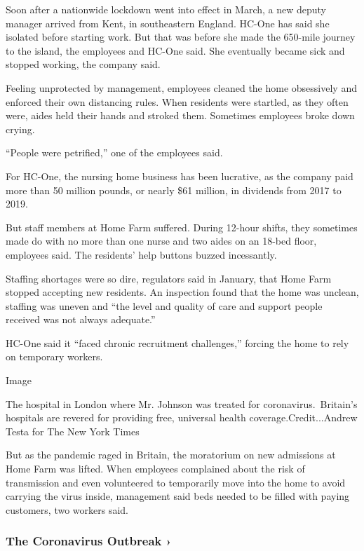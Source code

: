 Soon after a nationwide lockdown went into effect in March, a new deputy
manager arrived from Kent, in southeastern England. HC-One has said she
isolated before starting work. But that was before she made the 650-mile
journey to the island, the employees and HC-One said. She eventually
became sick and stopped working, the company said.

Feeling unprotected by management, employees cleaned the home
obsessively and enforced their own distancing rules. When residents were
startled, as they often were, aides held their hands and stroked them.
Sometimes employees broke down crying.

``People were petrified,'' one of the employees said.

For HC-One, the nursing home business has been lucrative, as the company
paid more than 50 million pounds, or nearly \$61 million, in dividends
from 2017 to 2019.

But staff members at Home Farm suffered. During 12-hour shifts, they
sometimes made do with no more than one nurse and two aides on an 18-bed
floor, employees said. The residents' help buttons buzzed incessantly.

Staffing shortages were so dire, regulators said in January, that Home
Farm stopped accepting new residents. An inspection found that the home
was unclean, staffing was uneven and ``the level and quality of care and
support people received was not always adequate.''

HC-One said it ``faced chronic recruitment challenges,'' forcing the
home to rely on temporary workers.

Image

The hospital in London where Mr. Johnson was treated for
coronavirus.~Britain's hospitals are revered for providing free,
universal health coverage.Credit...Andrew Testa for The New York Times

But as the pandemic raged in Britain, the moratorium on new admissions
at Home Farm was lifted. When employees complained about the risk of
transmission and even volunteered to temporarily move into the home to
avoid carrying the virus inside, management said beds needed to be
filled with paying customers, two workers said.

\href{https://www.nytimes.com/news-event/coronavirus?action=click\&pgtype=Article\&state=default\&region=MAIN_CONTENT_3\&context=storylines_faq}{}

\hypertarget{the-coronavirus-outbreak-}{%
\subsubsection{The Coronavirus Outbreak
›}\label{the-coronavirus-outbreak-}}


